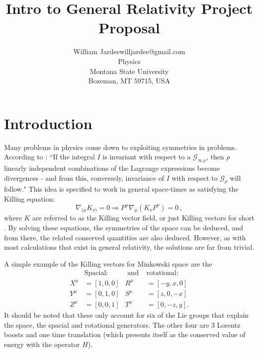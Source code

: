 \documentclass[twoside,11pt]{article}
\begin{document}
\title{Intro to General Relativity Project Proposal}

\author{\name William Jardee\email willjardee@gmail.com \\
       \addr Physics\\
       Montana State University\\
       Bozeman, MT 59715, USA
       }

\maketitle

 
\section{Introduction}
Many problems in physics come down to exploiting symmetries in problems. According to \cite{Noether_1971}: ``If the integral $I$ is invariant with respect to a $\mathcal{G}_{\infty \, \rho}$, then $\rho$ linearly independent combinations of the Lagrange expressions become divergences - and from this, conversely, invariance of $I$ with respect to $\mathcal{G}_\rho$ will follow." This idea is specified to work in general space-times as satisfying the Killing equation: 
\[\nabla_{(\mu}K_{\nu)} = 0 \Rightarrow P^\mu \nabla_\mu\left(K_\nu P^\nu\right) = 0 \, ,\]
where $K$ are referred to as the Killing vector field, or just Killing vectors for short \citep{carroll2019spacetime}. By solving these equations, the symmetries of the space can be deduced, and from there, the related conserved quantities are also deduced. However, as with most calculations that exist in general relativity, the solutions are far from trivial.

A simple example of the Killing vectors for Minkowski space are the
\begin{align*}
& \text{Spacial:} & \text{ and } & \text{rotational:}\\
X^\mu & = [1,0,0] & R^\mu & = [-y, x, 0]\\
Y^\mu & = [0,1,0] & S^\mu & = [z, 0 , -x]\\
Z^\mu & = [0,0,1] & T^\mu & = [0, -z, y].
\end{align*}
It should be noted that these only account for six of the Lie groups that explain the space, the spacial and rotational generators. The other four are 3 Lorentz boosts and one time translation (which presents itself as the conserved value of energy with the operator $H$). 
\end{document}
